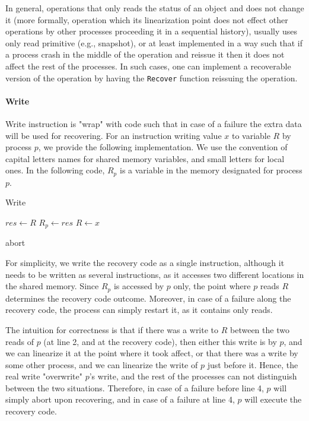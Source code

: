 In general, operations that only reads the status of an object and does not change it (more formally, operation which its linearization point does not effect other operations by other processes proceeding it in a sequential history), usually uses only read primitive (e.g., snapshot), or at least implemented in a way such that if a process crash in the middle of the operation and reissue it then it does not affect the rest of the processes. In such cases, one can implement a recoverable version of the operation by having the \texttt{Recover} function reissuing the operation.

\paragraph*{Write}
Write instruction is "wrap" with code such that in case of a failure the extra data will be used for recovering. For an instruction writing value $x$ to variable $R$ by process $p$, we provide the following implementation. We use the convention of capital letters names for shared memory variables, and small letters for local ones. In the following code, $R_p$ is a variable in the memory designated for process $p$.

\begin{algorithm}
	\caption{Write}\label{euclid}
	\begin{algorithmic}[1]
		\State $res \gets R$
		\State $R_{p} \gets res$
		\State $R \gets x$
		\EndProcedure
		
		 \Return abort
		\EndIf
		\EndProcedure
	\end{algorithmic}
\end{algorithm}

For simplicity, we write the recovery code as a single instruction, although it needs to be written as several instructions, as it accesses two different locations in the shared memory. Since $R_p$ is accessed by $p$ only, the point where $p$ reads $R$ determines the recovery code outcome. Moreover, in case of a failure along the recovery code, the process can simply restart it, as it contains only reads.

The intuition for correctness is that if there was a write to $R$ between the two reads of $p$ (at line 2, and at the recovery code), then either this write is by $p$, and we can linearize it at the point where it took affect, or that there was a write by some other process, and we can linearize the write of $p$ just before it. Hence, the real write "overwrite" $p$'s write, and the rest of the processes can not distinguish between the two situations. Therefore, in case of a failure before line 4, $p$ will simply abort upon recovering, and in case of a failure at line 4, $p$ will execute the recovery code.

